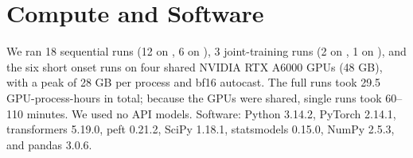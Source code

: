 \section{Compute and Software}
\label{app:compute}

We ran 18 sequential runs (12 on \llama, 6 on \qwen), 3 joint-training runs (2 on \llama, 1 on \qwen), and the six short onset runs on four shared NVIDIA RTX A6000 GPUs (48 GB), with a peak of 28 GB per process and bf16 autocast.
The full runs took 29.5 GPU-process-hours in total; because the GPUs were shared, single runs took 60--110 minutes.
We used no API models.
Software: Python 3.14.2, PyTorch 2.14.1, transformers 5.19.0, peft 0.21.2, SciPy 1.18.1, statsmodels 0.15.0, NumPy 2.5.3, and pandas 3.0.6.
